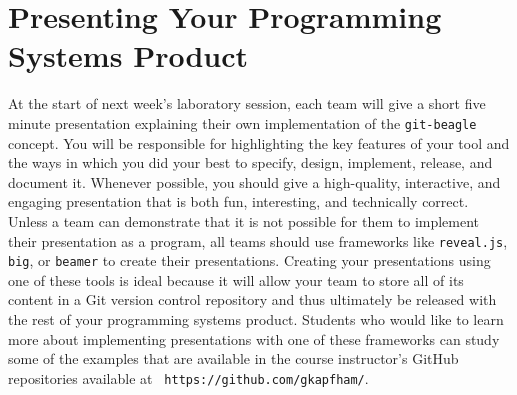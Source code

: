 \section*{Presenting Your Programming Systems Product}

At the start of next week's laboratory session, each team will give a short five minute presentation explaining their
own implementation of the {\tt git-beagle} concept. You will be responsible for highlighting the key features of your
tool and the ways in which you did your best to specify, design, implement, release, and document it. Whenever possible,
you should give a high-quality, interactive, and engaging presentation that is both fun, interesting, and technically
correct. Unless a team can demonstrate that it is not possible for them to implement their presentation as a program,
all teams should use frameworks like {\tt reveal.js}, {\tt big}, or {\tt beamer} to create their presentations. Creating
your presentations using one of these tools is ideal because it will allow your team to store all of its content in a
Git version control repository and thus ultimately be released with the rest of your programming systems product.
Students who would like to learn more about implementing presentations with one of these frameworks can study some of
the examples that are available in the course instructor's GitHub repositories available at {\tt
https://github.com/gkapfham/}.




